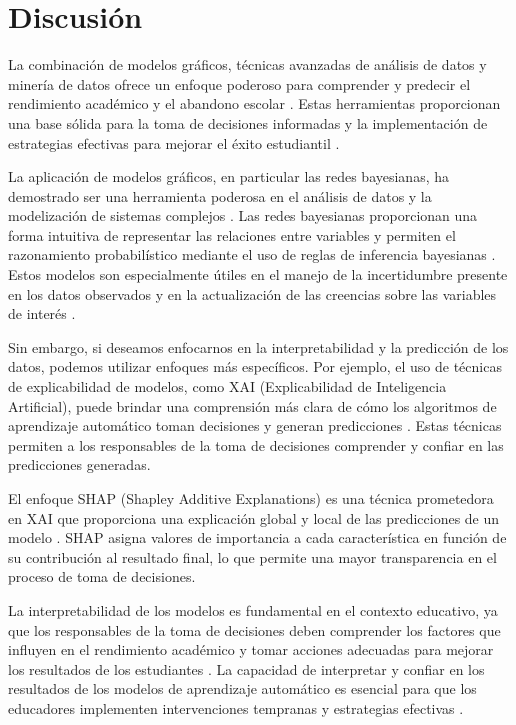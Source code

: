 \hypertarget{discusiuxf3n}{%
    \section{Discusión}\label{discusiuxf3n}}

    La combinación de modelos gráficos, técnicas avanzadas de análisis de datos y minería de datos ofrece un enfoque poderoso para comprender y predecir el rendimiento académico y el abandono escolar \cite{hair2019advanced}. Estas herramientas proporcionan una base sólida para la toma de decisiones informadas y la implementación de estrategias efectivas para mejorar el éxito estudiantil \cite{garcia2018prediccion, wang2017literature}.

    La aplicación de modelos gráficos, en particular las redes bayesianas, ha demostrado ser una herramienta poderosa en el análisis de datos y la modelización de sistemas complejos \cite{koller2009introduction}. Las redes bayesianas proporcionan una forma intuitiva de representar las relaciones entre variables y permiten el razonamiento probabilístico mediante el uso de reglas de inferencia bayesianas \cite{koller2009introduction, jensen2001bayesian}. Estos modelos son especialmente útiles en el manejo de la incertidumbre presente en los datos observados y en la actualización de las creencias sobre las variables de interés \cite{jensen2001bayesian}.
    
    Sin embargo, si deseamos enfocarnos en la interpretabilidad y la predicción de los datos, podemos utilizar enfoques más específicos. Por ejemplo, el uso de técnicas de explicabilidad de modelos, como XAI (Explicabilidad de Inteligencia Artificial), puede brindar una comprensión más clara de cómo los algoritmos de aprendizaje automático toman decisiones y generan predicciones \cite{lipton2018mythos, ribeiro2016trust}. Estas técnicas permiten a los responsables de la toma de decisiones comprender y confiar en las predicciones generadas.
    
    El enfoque SHAP (Shapley Additive Explanations) es una técnica prometedora en XAI que proporciona una explicación global y local de las predicciones de un modelo \cite{lundberg2017unified}. SHAP asigna valores de importancia a cada característica en función de su contribución al resultado final, lo que permite una mayor transparencia en el proceso de toma de decisiones.
    
    La interpretabilidad de los modelos es fundamental en el contexto educativo, ya que los responsables de la toma de decisiones deben comprender los factores que influyen en el rendimiento académico y tomar acciones adecuadas para mejorar los resultados de los estudiantes \cite{kocev2013need}. La capacidad de interpretar y confiar en los resultados de los modelos de aprendizaje automático es esencial para que los educadores implementen intervenciones tempranas y estrategias efectivas \cite{doshivelez2017rigorous}.
    
